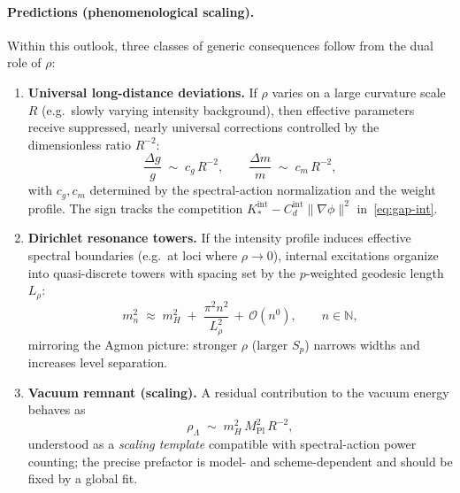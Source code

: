 \documentclass[11pt]{article}
\theoremstyle{definition}
\begin{document}
    \paragraph{Predictions (phenomenological scaling).}
    Within this outlook, three classes of generic consequences follow from the dual role of $\rho$:
    \begin{enumerate}
    	\item \textbf{Universal long-distance deviations.}
    	If $\rho$ varies on a large curvature scale $R$ (e.g.\ slowly varying intensity background), then effective parameters receive suppressed, nearly universal corrections controlled by the dimensionless ratio $R^{-2}$:
    	\[
    	\frac{\Delta g}{g}\;\sim\; c_g\,R^{-2},\qquad
    	\frac{\Delta m}{m}\;\sim\; c_m\,R^{-2},
    	\]
    	with $c_g,c_m$ determined by the spectral-action normalization and the weight profile. The sign tracks the competition $K_\ast^{\mathrm{int}}-C_d^{\mathrm{int}}\|\nabla\phi\|^2$ in~\eqref{eq:gap-int}.
    	\item \textbf{Dirichlet resonance towers.}
    	If the intensity profile induces effective spectral boundaries (e.g.\ at loci where $\rho\to 0$), internal excitations organize into quasi-discrete towers with spacing set by the $p$-weighted geodesic length $L_\rho$:
    	\[
    	m_n^2\;\approx\; m_H^2 \;+\; \frac{\pi^2 n^2}{L_\rho^2}\,+\,\mathcal{O}(n^0),\qquad n\in\mathbb{N},
    	\]
    	mirroring the Agmon picture: stronger $\rho$ (larger $S_p$) narrows widths and increases level separation.
    	\item \textbf{Vacuum remnant (scaling).}
    	A residual contribution to the vacuum energy behaves as
    	\[
    	\rho_\Lambda \;\sim\; m_H^2\,M_{\mathrm{Pl}}^2\,R^{-2},
    	\]
    	understood as a \emph{scaling template} compatible with spectral-action power counting; the precise prefactor is model- and scheme-dependent and should be fixed by a global fit.
    \end{enumerate}
    
\end{document}
